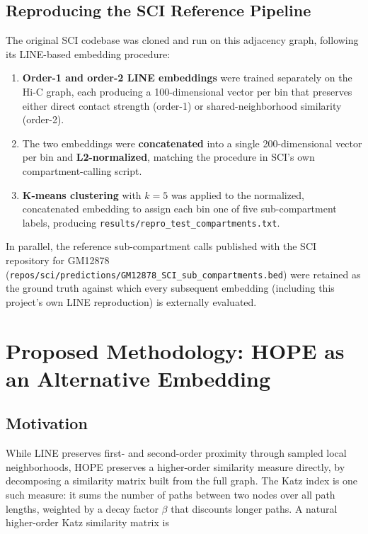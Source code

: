 \documentclass[12pt]{article}
\begin{document}
\subsection{Reproducing the SCI Reference Pipeline}
The original SCI codebase was cloned and run on this adjacency graph, following its LINE-based
embedding procedure:

\begin{enumerate}
    \item \textbf{Order-1 and order-2 LINE embeddings} were trained separately on the Hi-C graph,
    each producing a 100-dimensional vector per bin that preserves either direct contact
    strength (order-1) or shared-neighborhood similarity (order-2).
    \item The two embeddings were \textbf{concatenated} into a single 200-dimensional vector per
    bin and \textbf{L2-normalized}, matching the procedure in SCI's own compartment-calling
    script.
    \item \textbf{K-means clustering} with $k=5$ was applied to the normalized, concatenated
    embedding to assign each bin one of five sub-compartment labels, producing
    \texttt{results/\allowbreak repro\_test\_compartments.txt}.
\end{enumerate}

In parallel, the reference sub-compartment calls published with the SCI repository for GM12878
(\texttt{repos/sci/predictions/\allowbreak GM12878\_SCI\_sub\_compartments.bed}) were retained
as the ground truth against which every subsequent embedding (including this project's own LINE
reproduction) is externally evaluated.


\section{Proposed Methodology: HOPE as an Alternative Embedding}

\subsection{Motivation}
While LINE preserves first- and second-order proximity through sampled local neighborhoods,
HOPE preserves a higher-order similarity measure directly, by decomposing a similarity matrix
built from the full graph. The Katz index is one such measure: it sums the number of paths
between two nodes over all path lengths, weighted by a decay factor $\beta$ that discounts longer
paths. A natural higher-order Katz similarity matrix is
\end{document}

